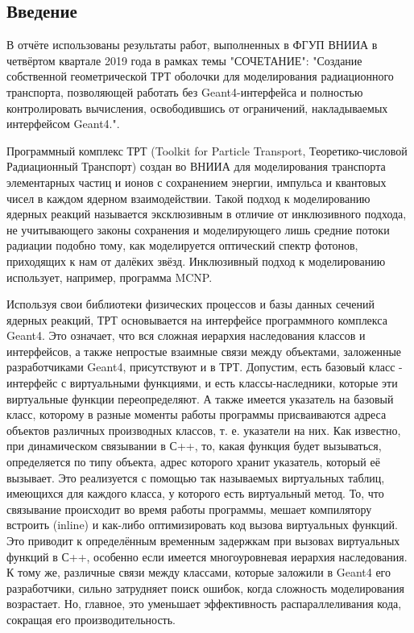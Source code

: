 \documentclass[a4paper,12pt]{article}
\begin{document}
\newpage

\tableofcontents

\begin{large}

\clearpage
\section{Введение}
\label{Intr}
  	В отчёте использованы результаты работ, выполненных в ФГУП ВНИИА в четвёртом квартале 2019 года в рамках темы "СОЧЕТАНИЕ": "Создание собственной геометрической ТРТ оболочки для моделирования радиационного транспорта, позволяющей работать без Geant4-интерфейса и полностью контролировать вычисления, освободившись от ограничений, накладываемых интерфейсом Geant4.".

    Программный комплекс ТРТ (Toolkit for Particle Transport, Теоретико-числовой Радиационный Транспорт) создан во ВНИИА для моделирования транспорта элементарных частиц и ионов с сохранением энергии, импульса и квантовых чисел в каждом ядерном взаимодействии.
    Такой подход к моделированию ядерных реакций называется эксклюзивным в отличие от инклюзивного подхода, не учитывающего законы сохранения и моделирующего лишь средние потоки радиации подобно тому, как моделируется оптический спектр фотонов, приходящих к нам от далёких звёзд.
    Инклюзивный подход к моделированию использует, например, программа MCNP.
    
    Используя свои библиотеки физических процессов и базы данных сечений ядерных реакций, ТРТ основывается на интерфейсе программного комплекса Geant4.
    Это означает, что вся сложная иерархия наследования классов и интерфейсов, а также непростые взаимные связи между объектами, заложенные разработчиками Geant4, присутствуют и в ТРТ.
    Допустим, есть базовый класс - интерфейс с виртуальными функциями, и есть классы-наследники, которые эти виртуальные функции переопределяют.
    А также имеется указатель на базовый класс, которому в разные моменты работы программы присваиваются адреса объектов различных производных классов, т. е. указатели на них.
    Как известно, при динамическом связывании в С++, то, какая функция будет вызываться, определяется по типу объекта, адрес которого хранит указатель, который её вызывает.
    Это реализуется с помощью так называемых виртуальных таблиц, имеющихся для каждого класса, у которого есть виртуальный метод.
    То, что связывание происходит во время работы программы, мешает компилятору встроить (inline) и  как-либо оптимизировать код вызова виртуальных функций.
    Это приводит к определённым временным задержкам при вызовах виртуальных функций в С++, особенно если имеется многоуровневая иерархия наследования.
    К тому же, различные связи между классами, которые заложили в Geant4 его разработчики, сильно затрудняет поиск ошибок, когда сложность моделирования возрастает.
    Но, главное, это уменьшает эффективность распараллеливания кода, сокращая его производительность.
    

\end{large}
\end{document}
